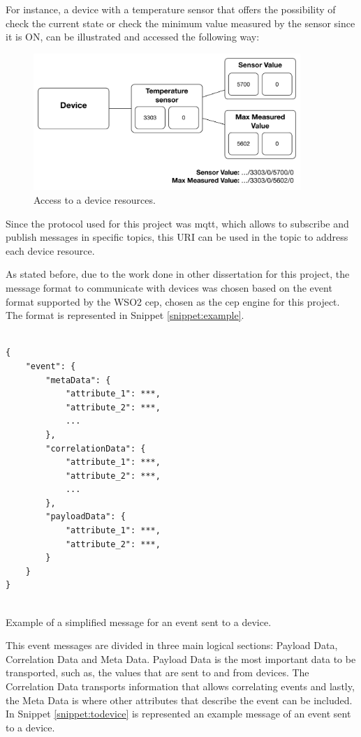 For instance, a device with a temperature sensor that offers the possibility of check the current state or check the minimum value measured by the sensor since it is ON, can be illustrated and accessed the following way:


\begin{figure}[H]
	\centering
	\includegraphics[width=0.9\textwidth]{figures/obj2.png}
	\caption{Access to a device resources.}
	\label{fig:obj2}
\end{figure}
	
Since the protocol used for this project was \ac{mqtt}, which allows to subscribe and publish messages in specific topics, this URI can be used in the topic to address each device resource. 

As stated before, due to the work done in other dissertation for this project, the message format to communicate with devices was chosen based on the event format supported by the WSO2 \ac{cep}, chosen as the \ac{cep} engine for this project. The format is represented in Snippet \ref{snippet:example}.

\begin{listing}[H]
\begin{verbatim}

{
    "event": {
        "metaData": { 
            "attribute_1": ***,
            "attribute_2": ***,
            ...
        },
        "correlationData": {
            "attribute_1": ***,
            "attribute_2": ***,
            ...
        }, 
        "payloadData": {
            "attribute_1": ***, 
            "attribute_2": ***,
        }
    }
}


\end{verbatim}
\caption{Example of a simplified message for an event sent to a device.}
\label{snippet:example}
\end{listing}

This event messages are divided in three main logical sections: Payload Data, Correlation Data and Meta Data. Payload Data is the most important data to be transported, such as, the values that are sent to and from devices. The Correlation Data transports information that allows correlating events and lastly, the Meta Data is where other attributes that describe the event can be included. In Snippet \ref{snippet:todevice} is represented an example message of an event sent to a device.

